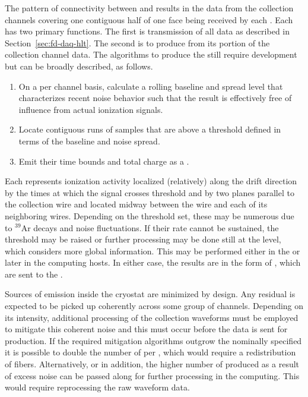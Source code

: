The pattern of connectivity between  and  results in the data
from the collection channels covering one contiguous half of one 
face being received by each .
Each  has two primary functions. 
The first is transmission of all data as described in
Section~\ref{sec:fd-daq-hlt}. 
The second is to produce  from its portion of the
collection channel data.
The algorithms to produce the  still require
development but can be broadly described, as follows.

\begin{enumerate}
\item On a per channel basis, calculate a rolling baseline and spread
  level that characterizes recent noise behavior such that the result
  is effectively free of influence from actual ionization signals.
\item Locate contiguous runs of  samples that are above a threshold
  defined in terms of the baseline and noise spread.
\item Emit their time bounds and total charge as a .
\end{enumerate}

Each  represents ionization activity localized
(relatively) along the drift direction by the times at which the
signal crosses threshold and by two planes parallel to the collection
wire and located midway between the wire and each of its neighboring
wires.
Depending on the threshold set, these  may be
numerous due to $^{39}$Ar decays and noise fluctuations.
If their rate cannot be sustained, the threshold may be raised or
further processing may be done still at the  level,  which
considers more global information.
This may be performed either in the  or later in the
 computing hosts. 
In either case, the results are in the form of ,
which are sent to the .

Sources of  emission inside the cryostat are minimized by
design. 
Any residual  is expected to be picked up coherently across
some group of channels. 
Depending on its intensity, additional processing of the collection
waveforms must be employed to mitigate this coherent noise and this
must occur before the data is sent for 
production. 
If the required mitigation algorithms outgrow the nominally specified
  it is possible to double the number of
 per , which would require a redistribution of fibers. 
Alternatively, or in addition, the higher number of
 produced as a result of excess noise can be
passed along for further processing in the  computing. 
This would require reprocessing the raw waveform data.

